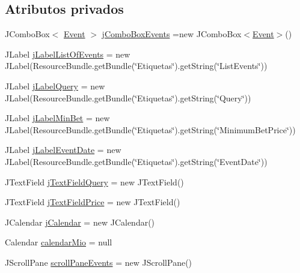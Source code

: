 \subsection*{Atributos privados}
\begin{DoxyCompactItemize}
\item 
J\+Combo\+Box$<$ \mbox{\hyperlink{classdomain_1_1Event}{Event}} $>$ \mbox{\hyperlink{classgui_1_1CreateQuestionGUI_a7cba1213dbc064173f83408ee9348354}{j\+Combo\+Box\+Events}} =new J\+Combo\+Box$<$\mbox{\hyperlink{classdomain_1_1Event}{Event}}$>$()
\item 
J\+Label \mbox{\hyperlink{classgui_1_1CreateQuestionGUI_a891ee3134074a77ab089c9b654172fb8}{j\+Label\+List\+Of\+Events}} = new J\+Label(Resource\+Bundle.\+get\+Bundle(\char`\"{}Etiquetas\char`\"{}).get\+String(\char`\"{}List\+Events\char`\"{}))
\item 
J\+Label \mbox{\hyperlink{classgui_1_1CreateQuestionGUI_a3a6aafbf3fb4ba909501668606612228}{j\+Label\+Query}} = new J\+Label(Resource\+Bundle.\+get\+Bundle(\char`\"{}Etiquetas\char`\"{}).get\+String(\char`\"{}Query\char`\"{}))
\item 
J\+Label \mbox{\hyperlink{classgui_1_1CreateQuestionGUI_a3c355b3f8563c1babcedb4be1f365ee6}{j\+Label\+Min\+Bet}} = new J\+Label(Resource\+Bundle.\+get\+Bundle(\char`\"{}Etiquetas\char`\"{}).get\+String(\char`\"{}Minimum\+Bet\+Price\char`\"{}))
\item 
J\+Label \mbox{\hyperlink{classgui_1_1CreateQuestionGUI_a5451d834c1a494fdb7b7dc2bb3499ecf}{j\+Label\+Event\+Date}} = new J\+Label(Resource\+Bundle.\+get\+Bundle(\char`\"{}Etiquetas\char`\"{}).get\+String(\char`\"{}Event\+Date\char`\"{}))
\item 
J\+Text\+Field \mbox{\hyperlink{classgui_1_1CreateQuestionGUI_a5b8aa435d7a5e058ac6f9bd0706d523e}{j\+Text\+Field\+Query}} = new J\+Text\+Field()
\item 
J\+Text\+Field \mbox{\hyperlink{classgui_1_1CreateQuestionGUI_a23aebdce43e2df93a150f96572dfb741}{j\+Text\+Field\+Price}} = new J\+Text\+Field()
\item 
J\+Calendar \mbox{\hyperlink{classgui_1_1CreateQuestionGUI_a8f04ad9ee4441b9a1bd2f8aedcddeadb}{j\+Calendar}} = new J\+Calendar()
\item 
Calendar \mbox{\hyperlink{classgui_1_1CreateQuestionGUI_a0857e19f9a0c2d101de0ca7c2dc01592}{calendar\+Mio}} = null
\item 
J\+Scroll\+Pane \mbox{\hyperlink{classgui_1_1CreateQuestionGUI_ae783664b007ad81c7b0ef9bd59ec9b4a}{scroll\+Pane\+Events}} = new J\+Scroll\+Pane()

\end{DoxyCompactItemize}
